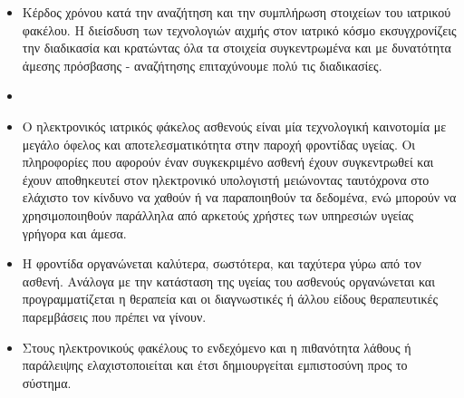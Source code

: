 \begin{itemize}

\item Κέρδος χρόνου κατά την αναζήτηση και την συμπλήρωση στοιχείων του ιατρικού φακέλου. Η διείσδυση των τεχνολογιών αιχμής στον ιατρικό κόσμο εκσυγχρονίζεις την διαδικασία και κρατώντας όλα τα στοιχεία συγκεντρωμένα και με δυνατότητα άμεσης πρόσβασης - αναζήτησης επιταχύνουμε πολύ τις διαδικασίες.


\item

\item Ο ηλεκτρονικός ιατρικός φάκελος ασθενούς είναι μία τεχνολογική καινοτομία με μεγάλο όφελος και αποτελεσματικότητα στην παροχή φροντίδας υγείας. Οι πληροφορίες που αφορούν έναν συγκεκριμένο ασθενή έχουν συγκεντρωθεί και έχουν αποθηκευτεί στον ηλεκτρονικό υπολογιστή μειώνοντας ταυτόχρονα στο ελάχιστο τον κίνδυνο να χαθούν ή να παραποιηθούν τα δεδομένα, ενώ μπορούν να χρησιμοποιηθούν παράλληλα από αρκετούς χρήστες των υπηρεσιών υγείας γρήγορα και άμεσα. 

\item Η φροντίδα οργανώνεται καλύτερα, σωστότερα, και ταχύτερα γύρω από τον ασθενή. Ανάλογα με την κατάσταση της υγείας του ασθενούς οργανώνεται και προγραμματίζεται η θεραπεία και οι διαγνωστικές ή άλλου είδους θεραπευτικές παρεμβάσεις που πρέπει να γίνουν.

\item Στους ηλεκτρονικούς φακέλους το ενδεχόμενο και η πιθανότητα λάθους ή παράλειψης ελαχιστοποιείται και έτσι δημιουργείται εμπιστοσύνη προς το σύστημα.



\end{itemize}


